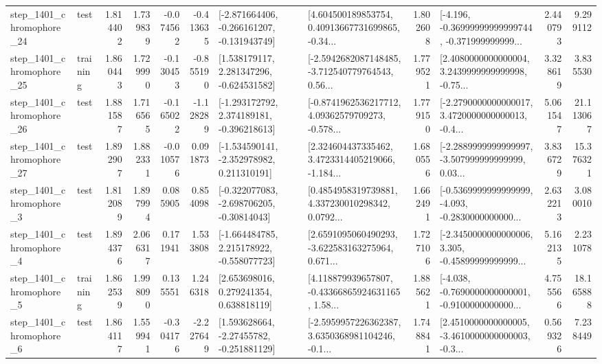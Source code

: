 \begin{tabular}{llrrrrllrlrr}
 step\_1401\_chromophore\_24 &      test &      1.814402 &    1.739839 &     -0.074562 & -0.413635 &  [-2.871664406, -0.266161207, -0.131943749] &  [4.604500189853754, 0.40913667731699865, -0.34... &       1.802608 &  [-4.196, -0.36999999999999744, -0.371999999999... &            2.440793 &          9.299112 \\
 step\_1401\_chromophore\_25 &  training &      1.860443 &    1.729990 &     -0.130453 & -0.855190 &    [1.538179117, 2.281347296, -0.624531582] &  [-2.5942682087148485, -3.712540779764543, 0.56... &       1.779521 &  [2.4080000000000004, 3.2439999999999998, -0.75... &            3.328619 &          3.835530 \\
 step\_1401\_chromophore\_26 &      test &      1.881587 &    1.716565 &     -0.165022 & -1.128289 &   [-1.293172792, 2.374189181, -0.396218613] &  [-0.8741962536217712, 4.09362579709273, -0.578... &       1.779150 &  [-2.2790000000000017, 3.4720000000000013, -0.4... &            5.061547 &         21.113067 \\
 step\_1401\_chromophore\_27 &      test &      1.892907 &    1.882331 &     -0.010576 &  0.091873 &   [-1.534590141, -2.352978982, 0.211310191] &  [2.324604437335462, 3.4723314405219066, -1.184... &       1.680556 &  [-2.2889999999999997, -3.507999999999999, 0.03... &            3.836729 &         15.376321 \\
  step\_1401\_chromophore\_3 &      test &      1.812089 &    1.897994 &      0.085905 &  0.854098 &   [-0.322077083, -2.698706205, -0.30814043] &  [0.4854958319739881, 4.337230010298342, 0.0792... &       1.662491 &  [-0.5369999999999999, -4.093, -0.2830000000000... &            2.632213 &          3.080010 \\
  step\_1401\_chromophore\_4 &      test &      1.894376 &    2.066317 &      0.171941 &  1.533808 &   [-1.664484785, 2.215178922, -0.558077723] &  [2.6591095060490293, -3.622583163275964, 0.671... &       1.727106 &  [-2.3450000000000006, 3.305, -0.45899999999999... &            5.162135 &          2.231078 \\
  step\_1401\_chromophore\_5 &  training &      1.862539 &    1.998090 &      0.135551 &  1.246318 &     [2.653698016, 0.279241354, 0.638818119] &  [4.118879939657807, -0.43366865924631165, 1.58... &       1.885621 &  [-4.038, -0.7690000000000001, -0.9100000000000... &            4.755566 &         18.165888 \\
  step\_1401\_chromophore\_6 &      test &      1.864117 &    1.559941 &     -0.304176 & -2.227649 &    [1.593628664, -2.27455782, -0.251881129] &  [-2.5959957226362387, 3.6350368981104246, -0.1... &       1.748841 &  [2.4510000000000005, -3.4610000000000003, -0.3... &            0.569326 &          7.238449 \\

\end{tabular}
